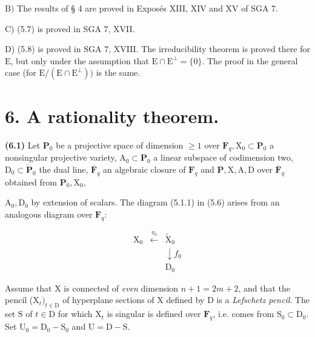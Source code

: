 \documentclass[10pt,leqno]{article}
\begin{document}
\noindent \(\mathrm{B})\) The results of § 4 are proved in Exposés XIII, XIV and XV of SGA 7.\par

\noindent C) (5.7) is proved in SGA 7, XVII.\par

\noindent D) (5.8) is proved in SGA 7, XVIII. The irreducibility theorem is proved there for \(\mathrm{E}\), but only under the assumption that \(\mathrm{E}\cap \mathrm{E}^{\perp }=\{0\}\). The proof in the general case (for \(\mathrm{E}/(\mathrm{E}\cap \mathrm{E}^{\perp }))\) is the same.\par

\section*{6. A rationality theorem.}

\noindent \textbf{(6.1)} Let \(\mathbf{P}_{0}\) be a projective space of dimension \(\geq 1\) over \(\mathbf{F}_{q}, \mathrm{X}_{0}\subset \mathbf{P}_{0}\) a nonsingular projective variety, \(\mathrm{A}_{0}\subset \mathbf{P}_{0}\) a linear subspace of codimension two, \(\mathrm{D}_{0}\subset \check{\mathbf{P}}_{0}\) the dual line, \(\overline{\mathbf{F}}_{q}\) an algebraic closure of \(\mathbf{F}_{q}\) and \(\mathbf{P}, \mathrm{X}, \mathrm{A}, \mathrm{D}\) over \(\overline{\mathbf{F}}_{q}\) obtained from \(\mathbf{P}_{0}, \mathrm{X}_{0}\),\par

\clearpage

\label{physical-24}\setcounter{page}{295}

\noindent \(\mathrm{A}_{0}, \mathrm{D}_{0}\) by extension of scalars. The diagram (5.1.1) in (5.6) arises from an analogous diagram over \(\mathbf{F}_{q}\):\par

\[\begin{array}{ccc}\mathrm X_0&\xleftarrow{\pi_0}&\widetilde{\mathrm X}_0\\ &&\downarrow\!{f_0}\\ &&\mathrm D_0\end{array}\tag{6.1.1}\]

\noindent Assume that \(\mathrm{X}\) is connected of \emph{even} dimension \(n+1=2m+2\), and that the pencil (\(\mathrm{X}_{t})_{t\in \mathrm{D}}\) of hyperplane sections of \(\mathrm{X}\) defined by \(\mathrm{D}\) is a \emph{Lefschetz pencil}. The set \(\mathrm{S}\) of \(t\in \mathrm{D}\) for which \(\mathrm{X}_{t}\) is singular is defined over \(\mathbf{F}_{q}\), i.e. comes from \(\mathrm{S}_{0}\subset \mathrm{D}_{0}\). Set \(\mathrm{U}_{0}=\mathrm{D}_{0}- \mathrm{S}_{0}\) and \(\mathrm{U}=\mathrm{D}- \mathrm{S}\).\par
\end{document}

